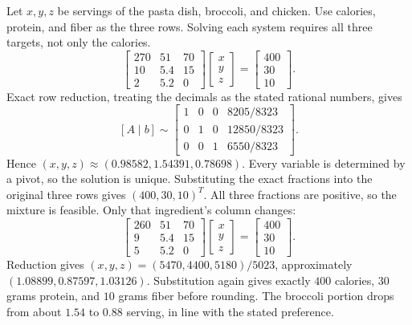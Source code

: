Let $x,y,z$ be servings of the pasta dish, broccoli, and chicken.
Use calories, protein, and fiber as the three rows. Solving each system
requires all three targets, not only the calories.
\[
 \begin{bmatrix}270&51&70\\10&5.4&15\\2&5.2&0\end{bmatrix}
 \begin{bmatrix}x\\y\\z\end{bmatrix}
 =\begin{bmatrix}400\\30\\10\end{bmatrix}.
\]
Exact row reduction, treating the decimals as the stated rational
numbers, gives
\[
 [A\mid b]\sim
 \begin{bmatrix}1&0&0&8205/8323\\0&1&0&12850/8323\\0&0&1&6550/8323\end{bmatrix}.
\]
Hence $(x,y,z)\approx(0.98582,1.54391,0.78698)$. Every variable
is determined by a pivot, so the solution is unique. Substituting the
exact fractions into the original three rows gives $(400,30,10)^T$.
All three fractions are positive, so the mixture is feasible.
Only that ingredient's column changes:
\[
 \begin{bmatrix}260&51&70\\9&5.4&15\\5&5.2&0\end{bmatrix}
 \begin{bmatrix}x\\y\\z\end{bmatrix}
 =\begin{bmatrix}400\\30\\10\end{bmatrix}.
\]
Reduction gives $(x,y,z)=(5470,4400,5180)/5023$, approximately
$(1.08899,0.87597,1.03126)$. Substitution again gives exactly
$400$ calories, $30$ grams protein, and $10$ grams fiber before
rounding. The broccoli portion drops from about $1.54$ to $0.88$
serving, in line with the stated preference.

